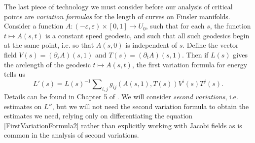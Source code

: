 
%
%
%
%
%

The last piece of technology we must consider before our analysis of critical points are \emph{variation formulas} for the length of curves on Finsler manifolds. Consider a function $A: (-\varepsilon,\varepsilon) \times [0,1] \to U_0$, such that for each $s$, the function $t \mapsto A(s,t)$ is a constant speed geodesic, and such that all such geodesics begin at the same point, i.e. so that $A(s,0)$ is independent of $s$. Define the vector field $V(s) = (\partial_s A)(s,1)$ and $T(s) = (\partial_t A)(s,1)$. Then if $L(s)$ gives the arclength of the geodesic $t \mapsto A(s,t)$, the first variation formula for energy tells us
%
\begin{equation} \label{FirstVariationFormula2}
    L'(s) = L(s)^{-1} \sum\nolimits_{i,j} g_{ij}( A(s,1), T(s) ) V^i(s) T^j(s).
\end{equation}
%
Details can be found in Chapter 5 of \cite{BaoChern}. We will consider \emph{second variations}, i.e. estimates on $L''$, but we will not need the second variation formula to obtain the estimates we need, relying only on differentiating the equation \eqref{FirstVariationFormula2} rather than explicitly working with Jacobi fields as is common in the analysis of second variations.

